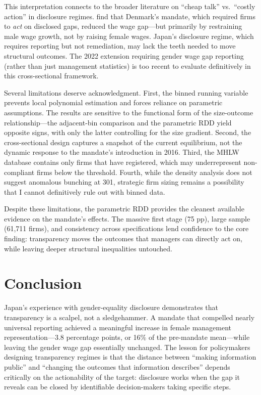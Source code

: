 \documentclass[12pt]{article}
\begin{document}
This interpretation connects to the broader literature on ``cheap talk'' vs.\ ``costly action'' in disclosure regimes. \citet{bennedsen2022} find that Denmark's mandate, which required firms to \textit{act} on disclosed gaps, reduced the wage gap---but primarily by restraining male wage growth, not by raising female wages. Japan's disclosure regime, which requires reporting but not remediation, may lack the teeth needed to move structural outcomes. The 2022 extension requiring gender wage gap reporting (rather than just management statistics) is too recent to evaluate definitively in this cross-sectional framework.

Several limitations deserve acknowledgment. First, the binned running variable prevents local polynomial estimation and forces reliance on parametric assumptions. The results are sensitive to the functional form of the size-outcome relationship---the adjacent-bin comparison and the parametric RDD yield opposite signs, with only the latter controlling for the size gradient. Second, the cross-sectional design captures a snapshot of the current equilibrium, not the dynamic response to the mandate's introduction in 2016. Third, the MHLW database contains only firms that have registered, which may underrepresent non-compliant firms below the threshold. Fourth, while the density analysis does not suggest anomalous bunching at 301, strategic firm sizing remains a possibility that I cannot definitively rule out with binned data.

Despite these limitations, the parametric RDD provides the cleanest available evidence on the mandate's effects. The massive first stage (75 pp), large sample (61,711 firms), and consistency across specifications lend confidence to the core finding: transparency moves the outcomes that managers can directly act on, while leaving deeper structural inequalities untouched.


\section{Conclusion}

Japan's experience with gender-equality disclosure demonstrates that transparency is a scalpel, not a sledgehammer. A mandate that compelled nearly universal reporting achieved a meaningful increase in female management representation---3.8 percentage points, or 16\% of the pre-mandate mean---while leaving the gender wage gap essentially unchanged. The lesson for policymakers designing transparency regimes is that the distance between ``making information public'' and ``changing the outcomes that information describes'' depends critically on the actionability of the target: disclosure works when the gap it reveals can be closed by identifiable decision-makers taking specific steps.
\end{document}
